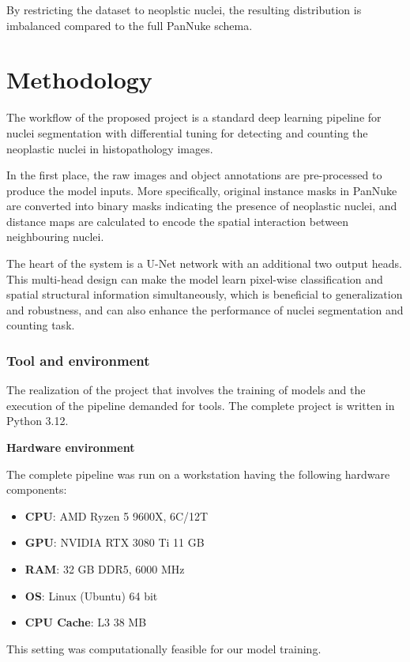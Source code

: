 \documentclass[target=bach,aauheader=,style=]{thud}
\begin{document}
By restricting the dataset to neoplstic nuclei, the resulting distribution is imbalanced compared to the full PanNuke schema.

\chapter{Methodology}
\label{sec:methodology}
The workflow of the proposed project is a standard deep learning pipeline for nuclei segmentation with differential tuning for detecting and counting the neoplastic nuclei in histopathology images.

In the first place, the raw images and object annotations are pre-processed to produce the model inputs. More specifically, original instance masks in PanNuke are converted into binary masks indicating the presence of neoplastic nuclei, and distance maps are calculated to encode the spatial interaction between neighbouring nuclei.

The heart of the system is a U-Net \cite{DBLP:journals/corr/RonnebergerFB15} network with an additional two output heads. This multi-head design can make the model learn pixel-wise classification and spatial structural information simultaneously, which is beneficial to generalization and robustness, and can also enhance the performance of nuclei segmentation and counting task.

\subsection{Tool and environment} The realization of the project that involves the training of models and the execution of the pipeline demanded for tools. The complete project is written in Python 3.12. \

\noindent\textbf{Hardware environment}\

\noindent The complete pipeline was run on a workstation having the following hardware components: \begin{itemize} 
    \item \textbf{CPU}: AMD Ryzen 5 9600X, 6C/12T 
    \item \textbf{GPU}: NVIDIA RTX 3080 Ti 11 GB
    \item \textbf{RAM}: 32 GB DDR5, 6000 MHz 
    \item \textbf{OS}: Linux (Ubuntu) 64 bit 
    \item \textbf{CPU Cache}: L3 38 MB 
\end{itemize} 
This setting was computationally feasible for our model training.
\end{document}
